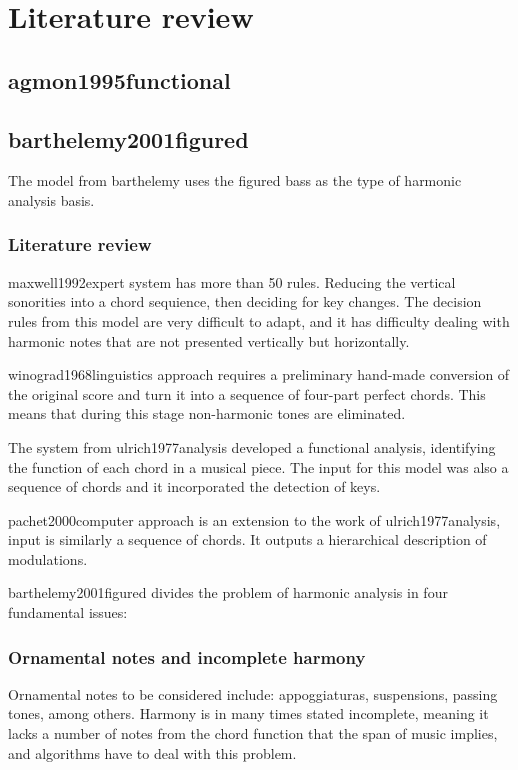 \normallinespacing

\chapter{Literature review}

\section{agmon1995functional }
\section{barthelemy2001figured }
The model from barthelemy uses the figured bass as the type of harmonic analysis basis.

\subsection{Literature review}
  maxwell1992expert system has more than 50 rules. Reducing the vertical sonorities into a chord sequience, then deciding for key changes. The decision rules from this model are very difficult to adapt, and it has difficulty dealing with harmonic notes that are not presented vertically but horizontally.

  winograd1968linguistics approach requires a preliminary hand-made conversion of the original score and turn it into a sequence of four-part perfect chords. This means that during this stage non-harmonic tones are eliminated.

  The system from ulrich1977analysis developed a functional analysis, identifying the function of each chord in a musical piece. The input for this model was also a sequence of chords and it incorporated the detection of keys.

  pachet2000computer approach is an extension to the work of ulrich1977analysis, input is similarly a sequence of chords. It outputs a hierarchical description of modulations.

barthelemy2001figured divides the problem of harmonic analysis in four fundamental issues:
\subsection{Ornamental notes and incomplete harmony}
    Ornamental notes to be considered include: appoggiaturas, suspensions, passing tones, among others.
    Harmony is in many times stated incomplete, meaning it lacks a number of notes from the chord function that the span of music implies, and algorithms have to deal with this problem.
